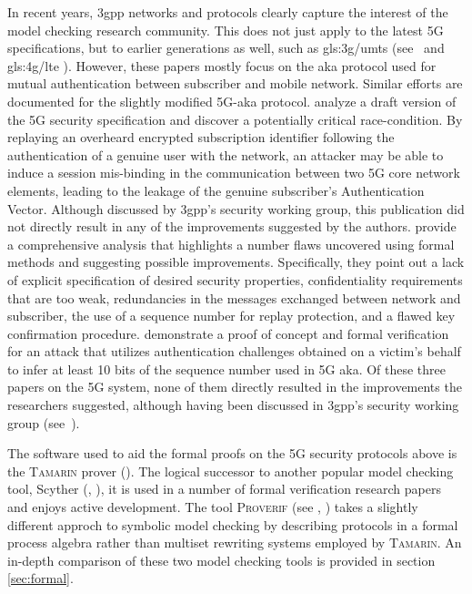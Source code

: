 In recent years, \gls{3gpp} networks and protocols clearly capture the interest of the model checking research community.
This does not just apply to the latest 5G specifications, but to earlier generations as well, such as \gls{gls:3g}/\gls{umts} (see~\cite{alt2016cryptographic} and \gls{gls:4g}/\gls{lte} \cite{lee2014anonymity}).
However, these papers mostly focus on the \gls{aka} protocol used for mutual authentication between subscriber and mobile network.
Similar efforts are documented for the slightly modified 5G-\gls{aka} protocol.
\cite{dehnel2018security} analyze a draft version of the 5G security specification and discover a potentially critical race-condition.
By replaying an overheard encrypted subscription identifier following the authentication of a genuine user with the network, an attacker may be able to induce a session mis-binding in the communication between two 5G core network elements, leading to the leakage of the genuine subscriber's Authentication Vector.
Although discussed by \gls{3gpp}'s security working group, this publication did not directly result in any of the improvements suggested by the authors.
\cite{basin2018formal} provide a comprehensive analysis that highlights a number flaws uncovered using formal methods and suggesting possible improvements.
Specifically, they point out a lack of explicit specification of desired security properties, confidentiality requirements that are too weak, redundancies in the messages exchanged between network and subscriber, the use of a sequence number for replay protection, and a flawed key confirmation procedure.
\cite{borgaonkar2019new} demonstrate a proof of concept and formal verification for an attack that utilizes authentication challenges obtained on a victim's behalf to infer at least 10 bits of the sequence number used in 5G \gls{aka}.
Of these three papers on the 5G system, none of them directly resulted in the improvements the researchers suggested, although having been discussed in \gls{3gpp}'s security working group (see~\cite{s3-180727}).

The software used to aid the formal proofs on the 5G security protocols above is the \textsc{Tamarin} prover (\cite{meier2013tamarin}).
The logical successor to another popular model checking tool, Scyther (\cite{cremers2008scyther}, \cite{scyther}), it is used in a number of formal verification research papers and enjoys active development.
The tool \textsc{Proverif} (see \cite{blanchet2016modeling}, \cite{proverif}) takes a slightly different approch to symbolic model checking by describing protocols in a formal process algebra rather than multiset rewriting systems employed by \textsc{Tamarin}.
An in-depth comparison of these two model checking tools is provided in section \ref{sec:formal}.

